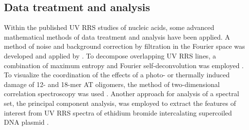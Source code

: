 \subsection{Data treatment and analysis}

Within the published UV RRS studies of nucleic acids, some advanced
mathematical methods of data treatment and analysis have been applied.
A method of noise and background correction by filtration in the Fourier
space was developed and applied by
\textcite{Laigle1982}.
To decompose overlapping UV RRS lines, a combination of maximum entropy and
Fourier self-deconvolution was employed
\parencite{Efremov1991}.
To visualize the coordination of the effects of a photo- or thermally induced
damage of 12- and 18-mer AT oligomers, the method of two-dimensional
correlation spectroscopy was used
\parencite{Jirasek2006}.
Another approach for analysis of a spectral set, the principal component
analysis, was employed to extract the features of interest from UV RRS spectra
of ethidium bromide intercalating supercoiled DNA plasmid
\parencite{Neugebauer2007}.
